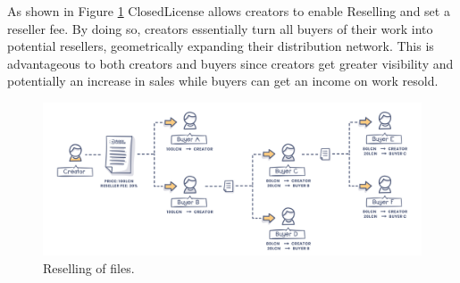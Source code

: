 As shown in Figure \ref{fig:reselling} ClosedLicense allows creators to enable Reselling and set a reseller fee. By doing so, creators essentially turn all buyers of their work into potential resellers, geometrically expanding their distribution network. This is advantageous to both creators and buyers since creators get greater visibility and potentially an increase in sales while buyers can get an income on work resold.

\begin{figure}[h]
\begin{minipage}{1\textwidth}
  \centering
  \includegraphics[width=1\linewidth]{./figures/fig6.png}
  \caption{Reselling of files.}
  \label{fig:reselling}
\end{minipage}
\end{figure}
